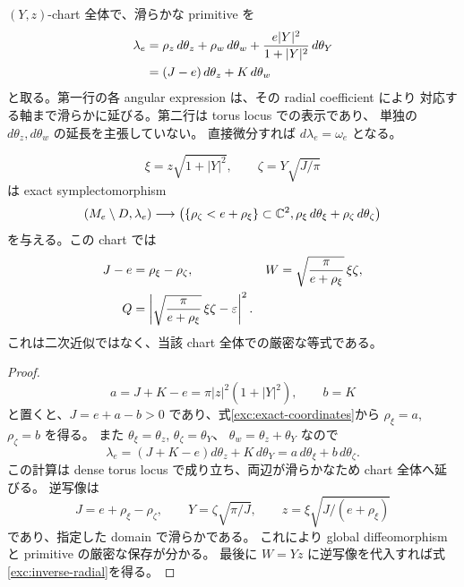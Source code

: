 $(Y,z)$-chart 全体で、滑らかな primitive を
\begin{align}
 \lambda_e
 &=\rho_z\,d\theta_z+\rho_w\,d\theta_w
      +\frac{e|Y|^2}{1+|Y|^2}\,d\theta_Y \notag\\
 &=(J-e)\,d\theta_z+K\,d\theta_w
 \label{exc:primitive}
\end{align}
と取る。第一行の各 angular expression は、その radial coefficient により
対応する軸まで滑らかに延びる。第二行は torus locus での表示であり、
単独の $d\theta_z,d\theta_w$ の延長を主張していない。
直接微分すれば $d\lambda_e=\omega_e$ となる。

\begin{proposition}
\label{exc:darboux}
\begin{equation}\label{exc:exact-coordinates}
 \xi=z\sqrt{1+|Y|^2},\qquad
 \zeta=Y\sqrt{J/\pi}
\end{equation}
は exact symplectomorphism
\[
 (M_e\setminus D,\lambda_e)\longrightarrow
 \bigl(\{\rho_\zeta<e+\rho_\xi\}\subset\mathbb C^2,
       \rho_\xi\,d\theta_\xi+\rho_\zeta\,d\theta_\zeta\bigr)
\]
を与える。この chart では
\begin{align}
 J-e&=\rho_\xi-\rho_\zeta,
 &W&=\sqrt{\frac{\pi}{e+\rho_\xi}}\,\xi\zeta,\label{exc:inverse-radial}\\
 Q&=\left|\sqrt{\frac{\pi}{e+\rho_\xi}}\,\xi\zeta
                      -\varepsilon\right|^2.\notag
\end{align}
これは二次近似ではなく、当該 chart 全体での厳密な等式である。
\end{proposition}

\begin{proof}
\[
 a=J+K-e=\pi|z|^2(1+|Y|^2),\qquad b=K
\]
と置くと、$J=e+a-b>0$ であり、式\eqref{exc:exact-coordinates}から
$\rho_\xi=a$, $\rho_\zeta=b$ を得る。
また $\theta_\xi=\theta_z$, $\theta_\zeta=\theta_Y$、
$\theta_w=\theta_z+\theta_Y$ なので
\[
 \lambda_e=(J+K-e)d\theta_z+K\,d\theta_Y
           =a\,d\theta_\xi+b\,d\theta_\zeta.
\]
この計算は dense torus locus で成り立ち、両辺が滑らかなため chart 全体へ延びる。
逆写像は
\begin{equation}\label{exc:exact-inverse}
 J=e+\rho_\xi-\rho_\zeta,\qquad
 Y=\zeta\sqrt{\pi/J},\qquad
 z=\xi\sqrt{J/(e+\rho_\xi)}
\end{equation}
であり、指定した domain で滑らかである。
これにより global diffeomorphism と primitive の厳密な保存が分かる。
最後に $W=Yz$ に逆写像を代入すれば式\eqref{exc:inverse-radial}を得る。
\end{proof}

